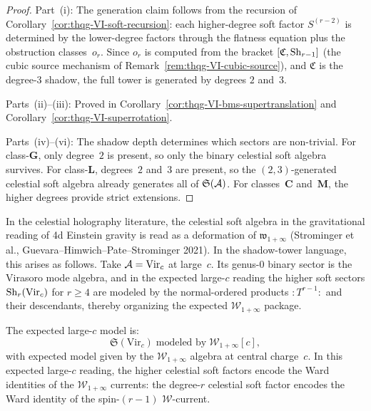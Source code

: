 \begin{proof}
Part~(i): The generation claim follows from the recursion of
Corollary~\ref{cor:thqg-VI-soft-recursion}: each higher-degree
soft factor $S^{(r-2)}$ is determined by the lower-degree factors
through the flatness equation plus the obstruction
classes~$o_r$. Since $o_r$ is computed from the bracket
$[\mathfrak{C}, \operatorname{Sh}_{r-1}]$ (the cubic source mechanism of
Remark~\ref{rem:thqg-VI-cubic-source}), and $\mathfrak{C}$ is
the degree-$3$ shadow, the full tower is generated by degrees $2$
and~$3$.

Parts~(ii)--(iii): Proved in
Corollary~\ref{cor:thqg-VI-bms-supertranslation} and
Corollary~\ref{cor:thqg-VI-superrotation}.

Parts~(iv)--(vi): The shadow depth determines which sectors are
non-trivial. For class-$\mathbf{G}$, only degree~$2$ is present,
so only the binary celestial soft algebra survives. For
class-$\mathbf{L}$, degrees~$2$ and~$3$ are present, so the
$(2,3)$-generated celestial soft algebra already generates all of
$\mathfrak{S}(\mathcal{A})$. For classes~$\mathbf{C}$ and~$\mathbf{M}$,
the higher degrees provide strict extensions.
\end{proof}

\begin{remark}
\label{rem:thqg-VI-w-infinity}
In the celestial holography literature, the celestial soft algebra in
the gravitational reading of 4d Einstein gravity is read as a deformation of
$\mathfrak{w}_{1+\infty}$ (Strominger et al.,
Guevara--Himwich--Pate--Strominger 2021). In the shadow-tower
language, this arises as follows. Take $\mathcal{A} = \mathrm{Vir}_c$
at large~$c$. Its genus-$0$ binary sector is the Virasoro
mode algebra, and in the expected large-$c$ reading the higher soft
sectors $\operatorname{Sh}_r(\mathrm{Vir}_c)$ for $r \geq 4$ are modeled by the
normal-ordered products $:T^{r-1}:$ and their descendants, thereby
organizing the expected $\mathcal{W}_{1+\infty}$ package.

The expected large-$c$ model is:
\begin{equation}%
\mathfrak{S}(\mathrm{Vir}_c)
\;\text{modeled by}\;
\mathcal{W}_{1+\infty}[c],
\end{equation}
with expected model given by the $\mathcal{W}_{1+\infty}$ algebra at
central charge~$c$.
In this expected large-$c$ reading, the higher celestial soft
factors encode the Ward identities of the
$\mathcal{W}_{1+\infty}$ currents: the degree-$r$ celestial soft
factor encodes the Ward identity of the spin-$(r-1)$
$\mathcal{W}$-current.
\end{remark}

